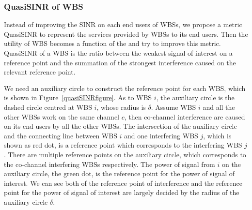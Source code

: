 

\subsubsection*{QuasiSINR of WBS}

Instead of improving the SINR on each end users of WBSs, we propose a metric QuasiSINR to represent the services provided by WBSs to its end users.
Then the utility of WBS becomes a function of the  and try to improve this metric.
QuasiSINR of a WBS is the ratio between the weakest signal of interest on a reference point and the summation of the strongest interference caused on the relevant reference point.

We need an auxiliary circle to construct the reference point for each WBS, which is shown in Figure~\ref{quasiSINRfigure}. %
As to WBS $i$, the auxiliary circle is the dashed circle centred at WBS $i$, whose radius is $\delta$.
Assume WBS $i$ and all the other WBSs work on the same channel $c$, then co-channel interference are caused on its end users by all the other WBSs.
The intersection of the auxiliary circle and the connecting line between WBS $i$ and one interfering WBS $j$, which is shown as red dot, is a reference point which corresponds to the interfering WBS $j$.
There are multiple reference points on the auxiliary circle, which corresponds to the co-channel interfering WBSs respectively.
The power of signal from $i$ on the auxiliary circle, the green dot, is the reference point for the power of signal of interest.
We can see both of the reference point of interference and the reference point for the power of signal of interest are largely decided by the radius of the auxiliary circle $\delta$.

